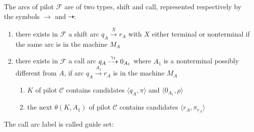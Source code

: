 \documentclass[english]{article}
\begin{document}
\bigskip
The arcs of pilot \(\mathcal{F}\) are of two types, shift and call, represented respectively by the symbols \(\rightarrow\) and \(\dashrightarrow\):

\begin{enumerate}
  \item there exists in \(\mathcal{F}\) a shift arc \(q_A \xrightarrow{X} r_A\) with \(X\) either terminal or nonterminal if the same arc is in the machine \(M_A\)
  \item there exists in \(\mathcal{F}\) a call arc \(q_A \stackrel{\gamma_1}{\dashrightarrow} 0_{A_1}\) where \(A_1\) is a nonterminal possibly different from \(A\), if arc \(q_A \xrightarrow{A_1} r_A\) is in the machine \(M_A\)
        \begin{enumerate}[label=\(\rightarrow\) necessary condition \arabic*., leftmargin=*, labelindent=2em, widest*=24]
          \item \mstate \(K\) of pilot \(\mathcal{C}\) contains candidates \(\langle q_A, \pi \rangle\) and \(\langle 0_{A_1}, \rho\rangle\)
          \item the next \mstate \(\theta(K, A_1)\) of pilot \(\mathcal{C}\) contains candidates \(\langle r_A, \pi_{r_A} \rangle\)
        \end{enumerate}
\end{enumerate}

\bigskip
The call arc label is called guide set:
\end{document}
